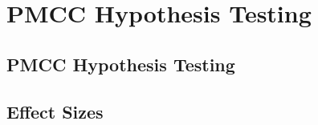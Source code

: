 \documentclass[../alevelmaths.tex]{subfiles}
\begin{document}
\chapter{PMCC Hypothesis Testing}
\section{PMCC Hypothesis Testing}
\section{Effect Sizes}
\end{document}
